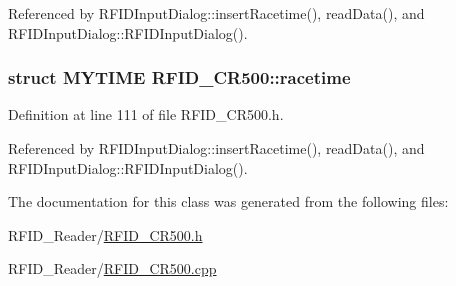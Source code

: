 Referenced by RFIDInputDialog::insertRacetime(), readData(), and RFIDInputDialog::RFIDInputDialog().\hypertarget{class_r_f_i_d___c_r500_1790d6c17d8367723c96ad74515bd709}{
\subsubsection[racetime]{\setlength{\rightskip}{0pt plus 5cm}struct {\bf MYTIME} {\bf RFID\_\-CR500::racetime}}}
\label{class_r_f_i_d___c_r500_1790d6c17d8367723c96ad74515bd709}




Definition at line 111 of file RFID\_\-CR500.h.

Referenced by RFIDInputDialog::insertRacetime(), readData(), and RFIDInputDialog::RFIDInputDialog().

The documentation for this class was generated from the following files:\begin{CompactItemize}
\item 
RFID\_\-Reader/\hyperlink{_r_f_i_d___c_r500_8h}{RFID\_\-CR500.h}\item 
RFID\_\-Reader/\hyperlink{_r_f_i_d___c_r500_8cpp}{RFID\_\-CR500.cpp}\end{CompactItemize}
